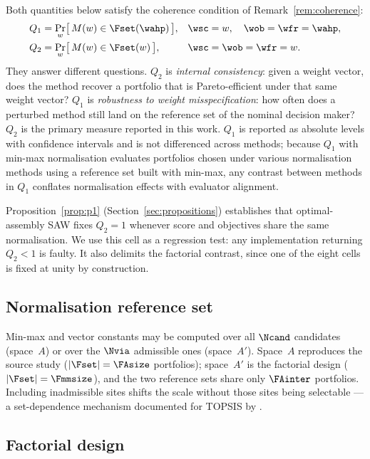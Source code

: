Both quantities below satisfy the coherence condition of
Remark~\ref{rem:coherence}:
\begin{align}
  Q_1 &= \Pr_{w}\bigl[\,M(w)\in\Fset(\wahp)\,\bigr],
    && \wsc=w,\quad \wob=\wfr=\wahp, \label{eq:Q1} \\
  Q_2 &= \Pr_{w}\bigl[\,M(w)\in\Fset(w)\,\bigr],
    && \wsc=\wob=\wfr=w. \label{eq:Q2}
\end{align}
They answer different questions.
$Q_2$ is \emph{internal consistency}: given a weight vector, does the
method recover a portfolio that is Pareto-efficient under that same weight
vector?
$Q_1$ is \emph{robustness to weight misspecification}: how often does a
perturbed method still land on the reference set of the nominal decision
maker?
$Q_2$ is the primary measure reported in this work.
$Q_1$ is reported as absolute levels with confidence intervals and is not
differenced across methods; because $Q_1$ with min-max normalisation
evaluates portfolios chosen under various normalisation methods using a
reference set built with min-max, any contrast between methods in $Q_1$
conflates normalisation effects with evaluator alignment.

Proposition~\ref{prop:p1} (Section~\ref{sec:propositions}) establishes that
optimal-assembly SAW fixes $Q_2=1$ whenever score and objectives share the
same normalisation. We use this cell as a regression test: any implementation
returning $Q_2<1$ is faulty. It also delimits the factorial contrast, since
one of the eight cells is fixed at unity by construction.

\subsection{Normalisation reference set}

Min-max and vector constants may be computed over all $\Ncand$ candidates
(space~$A$) or over the $\Nvia$ admissible ones (space~$A'$).
Space~$A$ reproduces the source study ($|\Fset|=\FAsize$ portfolios);
space~$A'$ is the factorial design ($|\Fset|=\Fmmsize$), and the two
reference sets share only $\FAinter$ portfolios.
Including inadmissible sites shifts the scale without those sites being
selectable --- a set-dependence mechanism documented for TOPSIS by
\citet{GarciaCascales2012}.

\subsection{Factorial design}

